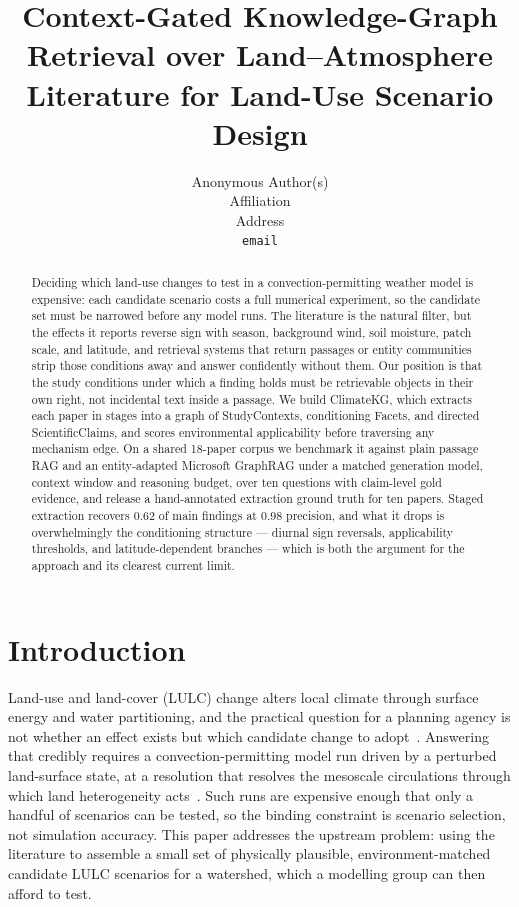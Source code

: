 \documentclass{article}
\title{Context-Gated Knowledge-Graph Retrieval over Land--Atmosphere\\Literature for Land-Use Scenario Design}
\author{%
  Anonymous Author(s) \\
  Affiliation \\
  Address \\
  \texttt{email}
}
\begin{document}
\maketitle

\begin{abstract}
Deciding which land-use changes to test in a convection-permitting weather model is
expensive: each candidate scenario costs a full numerical experiment, so the candidate
set must be narrowed before any model runs. The literature is the natural filter, but
the effects it reports reverse sign with season, background wind, soil moisture, patch
scale, and latitude, and retrieval systems that return passages or entity communities
strip those conditions away and answer confidently without them. Our position is that
the study conditions under which a finding holds must be retrievable objects in their
own right, not incidental text inside a passage. We build ClimateKG, which extracts each
paper in stages into a graph of StudyContexts, conditioning Facets, and directed
ScientificClaims, and scores environmental applicability before traversing any mechanism
edge. On a shared 18-paper corpus we benchmark it against plain passage RAG and an
entity-adapted Microsoft GraphRAG under a matched generation model, context window and
reasoning budget, over ten questions with claim-level gold evidence, and release a
hand-annotated extraction ground truth for ten papers. Staged extraction recovers $0.62$
of main findings at $0.98$ precision, and what it drops is overwhelmingly the
conditioning structure --- diurnal sign reversals, applicability thresholds, and
latitude-dependent branches --- which is both the argument for the approach and its
clearest current limit.
\end{abstract}

\section{Introduction}

Land-use and land-cover (LULC) change alters local climate through surface energy
and water partitioning, and the practical question for a planning agency is not
whether an effect exists but which candidate change to
adopt~\citep{pielke2007overview,cao2020landscape,alkama2016biophysical}. Answering
that credibly requires a convection-permitting model run driven by a perturbed
land-surface state, at a resolution that resolves the mesoscale circulations through
which land heterogeneity acts~\citep{prein2015review,ban2021ensemble,skamarock2019wrf}.
Such runs are expensive enough that only a handful of scenarios can be tested, so the
binding constraint is scenario selection, not simulation accuracy. This paper addresses
the upstream problem: using the literature to assemble a small set of physically
plausible, environment-matched candidate LULC scenarios for a watershed, which a
modelling group can then afford to test.
\end{document}
